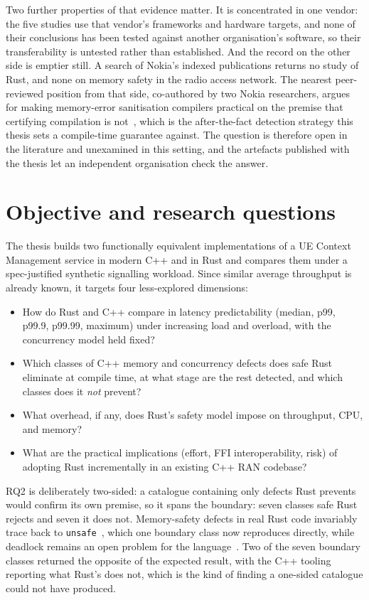\documentclass[11pt,a4paper]{article}
\newenvironment{tightitemize}
  {\begin{itemize}
     \setlength{\topsep}{2pt}\setlength{\itemsep}{0pt}
     \setlength{\parsep}{0pt}\setlength{\parskip}{0pt}}
  {\end{itemize}}
\begin{document}
Two further properties of that evidence matter. It is concentrated in one
vendor: the five studies use that vendor's frameworks and hardware targets, and
none of their conclusions has been tested against another organisation's
software, so their transferability is untested rather than established. And the
record on the other side is emptier still. A search of Nokia's indexed
publications returns no study of Rust, and none on memory safety in the radio
access network. The nearest peer-reviewed position from that side, co-authored
by two Nokia researchers, argues for making memory-error sanitisation compilers
practical on the premise that certifying compilation is
not~\cite{gjomemo2016mesc}, which is the after-the-fact detection strategy
this thesis sets a compile-time guarantee against. The question is therefore
open in the literature and unexamined in this setting, and the artefacts
published with the thesis let an independent organisation check the answer.

\section{Objective and research questions}

The thesis builds two functionally equivalent implementations of a UE Context
Management service in modern C++ and in Rust and compares them under a
spec-justified synthetic signalling workload. Since similar average throughput
is already known, it targets four less-explored dimensions:

\begin{tightitemize}
  \item[\textbf{RQ1}] How do Rust and C++ compare in latency predictability
  (median, p99, p99.9, p99.99, maximum) under increasing load and overload, with the
  concurrency model held fixed?
  \item[\textbf{RQ2}] Which classes of C++ memory and concurrency defects does
  safe Rust eliminate at compile time, at what stage are the rest detected, and
  which classes does it \emph{not} prevent?
  \item[\textbf{RQ3}] What overhead, if any, does Rust's safety model impose on
  throughput, CPU, and memory?
  \item[\textbf{RQ4}] What are the practical implications (effort, FFI
  interoperability, risk) of adopting Rust incrementally in an existing C++ RAN
  codebase?
\end{tightitemize}

RQ2 is deliberately two-sided: a catalogue containing only defects Rust
prevents would confirm its own premise, so it spans the boundary: seven
classes safe Rust rejects and seven it does not. Memory-safety defects in real
Rust code invariably trace back to \texttt{unsafe}~\cite{xu2021rustcve}, which
one boundary class now reproduces directly, while
deadlock remains an open problem for the language~\cite{zhang2026deadlock}.
Two of the seven boundary classes returned the opposite of the expected result,
with the C++ tooling reporting what Rust's does not, which is the kind of
finding a one-sided catalogue could not have produced.
\end{document}
